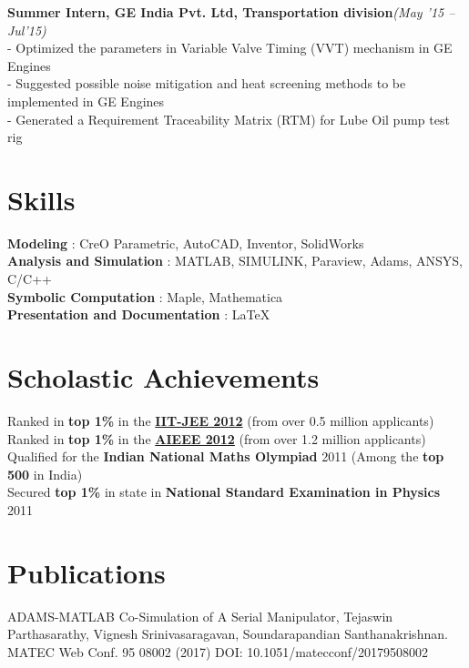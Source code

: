 \documentclass[margin,line]{res}
\begin{document}
\begin{resume}
\textbullet\hspace{0.005cm} {\bf Summer Intern, GE India Pvt. Ltd, Transportation division}\hfill {\em (May '15 -- Jul'15)}\\
- Optimized the parameters in Variable Valve Timing (VVT) mechanism in GE Engines\\
- Suggested possible noise mitigation and heat screening methods to be implemented in GE Engines\\
- Generated a Requirement Traceability Matrix (RTM) for Lube Oil pump test rig

\section {\sc Skills}
\textbullet\hspace{0.005cm} {\bf Modeling} : CreO Parametric, AutoCAD, Inventor, SolidWorks \\
\textbullet\hspace{0.005cm} {\bf Analysis and Simulation} : MATLAB, SIMULINK, Paraview, Adams, ANSYS, C/C++\\
\textbullet\hspace{0.005cm} {\bf Symbolic Computation} : Maple, Mathematica\\
\textbullet\hspace{0.005cm} {\bf Presentation and Documentation} : \LaTeX 

\section{\sc Scholastic Achievements}
\textbullet\hspace{0.005cm} Ranked in {\bf top 1\%} in the \href{https://en.wikipedia.org/wiki/Indian_Institute_of_Technology_Joint_Entrance_Examination}{\bf IIT-JEE 2012} (from over 0.5 million applicants)\\
\textbullet\hspace{0.005cm} Ranked in {\bf top 1\%} in the \href{https://en.wikipedia.org/wiki/All_India_Engineering_Entrance_Examination}{\bf AIEEE 2012} (from over 1.2 million applicants)\\
\textbullet\hspace{0.005cm} Qualified for the {\bf Indian National Maths Olympiad} 2011 (Among the {\bf top 500} in India)\\
\textbullet\hspace{0.005cm} Secured {\bf top 1\%} in state in {\bf National Standard Examination in Physics} 2011

\section {\sc Publications}
\textbullet\hspace{0.005cm} ADAMS-MATLAB Co-Simulation of A Serial Manipulator, Tejaswin  Parthasarathy, Vignesh Srinivasaragavan, Soundarapandian  Santhanakrishnan. MATEC Web Conf. 95 08002 (2017) DOI: 10.1051/matecconf/20179508002
\end{resume}
\end{document}

